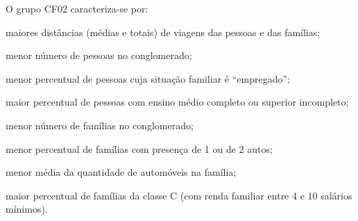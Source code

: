 O grupo CF02 caracteriza-se por:
\begin{compactitem}
\item maiores distâncias (médias e totais) de viagens das pessoas e das famílias;

\item menor número de pessoas no conglomerado;
\item menor percentual de pessoas cuja situação familiar é ``empregado'';
\item maior percentual de pessoas com ensino médio completo ou superior incompleto;

\item menor número de famílias no conglomerado;
\item menor percentual de famílias com presença de 1 ou de 2 autos;
\item menor média da quantidade de automóveis na família;
\item maior percentual de famílias da classe C (com renda familiar entre 4 e 10 salários mínimos).
\end{compactitem}

